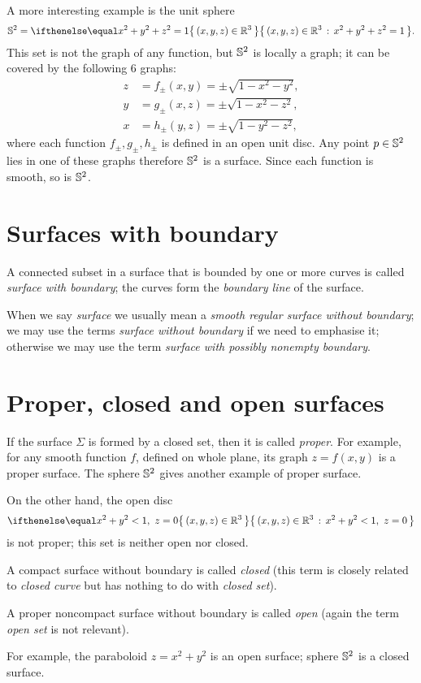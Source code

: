 A more interesting example is the unit sphere 
\[\SS^2=\set{(x,y,z)\in\RR^3}{x^2+y^2+z^2=1}.\]
This set is not the graph of any function,
but $\mathbb{S}^2$ is locally a graph;
it can be covered by the following 6 graphs:
\begin{align*}
z&=f_\pm(x,y)=\pm \sqrt{1-x^2-y^2},
\\
y&=g_\pm(x,z)=\pm \sqrt{1-x^2-z^2},
\\
x&=h_\pm(y,z)=\pm \sqrt{1-y^2-z^2},
\end{align*}
where each function $f_\pm,g_\pm,h_\pm$ is defined in an open unit disc.
Any point $p\in\mathbb{S}^2$ lies in one of these graphs therefore $\mathbb{S}^2$ is a surface.
Since each function is smooth, so is $\mathbb{S}^2$.

\section*{Surfaces with boundary}
A connected subset in a surface that is bounded by one or more 
curves is called \emph{surface with boundary}; the curves form the \emph{boundary line} of the surface.

When we say \emph{surface} we usually mean a \emph{smooth regular surface without boundary};
we may use the terms \emph{surface without boundary} if we need to emphasise it;
otherwise we may use the term \emph{surface with possibly nonempty boundary}.

\section*{Proper, closed and open surfaces}
If the surface $\Sigma$ is formed by a closed set, then it is called \emph{proper}.
For example, for any smooth function $f$, defined on whole plane, its graph $z=f(x,y)$ is a proper surface.
The sphere $\mathbb{S}^2$ gives another example of proper surface.

On the other hand, the open disc 
\[\set{(x,y,z)\in\RR^3}{x^2+y^2<1,\  z=0}\]
is not proper; this set is neither open nor closed.

A compact surface without boundary is called \emph{closed}
(this term is closely related to \emph{closed curve} but has nothing to do with \emph{closed set}).

A proper noncompact surface without boundary is called \emph{open} (again the term \emph{open set} is not relevant).

For example, the paraboloid $z=x^2+y^2$
is an open surface; 
sphere $\mathbb{S}^2$ is a closed surface.

